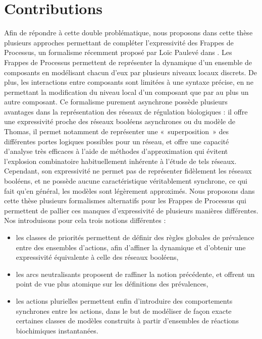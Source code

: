 \section{Contributions}

Afin de répondre à cette double problématique,
nous proposons dans cette thèse plusieurs approches permettant de compléter l'expressivité
des Frappes de Processus, un formalisme récemment proposé par Loïc Paulevé dans \toref.
Les Frappes de Processus permettent de représenter la dynamique d'un ensemble de composants
en modélisant chacun d'eux par plusieurs niveaux locaux discrets.
De plus, les interactions entre composants sont limitées à une syntaxe précise,
en ne permettant la modification du niveau local d'un composant que par au plus un autre composant.
Ce formalisme purement asynchrone possède plusieurs avantages dans la
représentation des réseaux de régulation biologiques :
il offre une expressivité proche des réseaux booléens asynchrones ou du modèle de Thomas,
il permet notamment de représenter une «~superposition~» des différentes portes logiques possibles
pour un réseau,
et offre une capacité d'analyse très efficaces à l'aide de méthodes d'approximation
qui évitent l'explosion combinatoire habituellement inhérente à l'étude de tels réseaux.
Cependant, son expressivité ne permet pas de représenter fidèlement les réseaux booléens,
et ne possède aucune caractéristique véritablement synchrone,
ce qui fait qu'en général, les modèles sont légèrement approximés.
Nous proposons dans cette thèse plusieurs formalismes alternatifs pour les Frappes de Processus
qui permettent de pallier ces manques d'expressivité de plusieurs manières différentes.
Nos introduisons pour cela trois notions différentes :
\begin{itemize}
  \item les classes de priorités permettent de définir des règles globales de prévalence
    entre des ensembles d'actions, afin d'affiner la dynamique et d'obtenir une expressivité
    équivalente à celle des réseaux booléens,
  \item les arcs neutralisants proposent de raffiner la notion précédente,
    et offrent un point de vue plus atomique sur les définitions des prévalences,
   \item les actions plurielles permettent enfin d'introduire des comportements synchrones
    entre les actions, dans le but de modéliser de façon exacte certaines classes
    de modèles construits à partir d'ensembles de réactions biochimiques instantanées.
\end{itemize}

